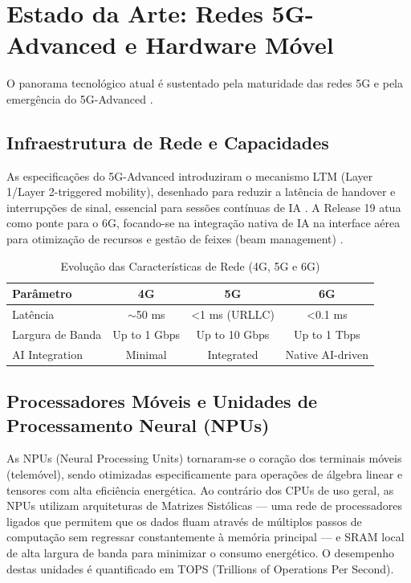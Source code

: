 \documentclass[runningheads]{llncs}
\begin{document}
\section{Estado da Arte: Redes 5G-Advanced e Hardware Móvel}
O panorama tecnológico atual é sustentado pela maturidade das redes 5G e pela emergência do 5G-Advanced \cite{ieee2022}.

\subsection{Infraestrutura de Rede e Capacidades}
As especificações do 5G-Advanced introduziram o mecanismo LTM (Layer 1/Layer 2-triggered mobility), desenhado para reduzir a latência de handover e interrupções de sinal, essencial para sessões contínuas de IA \cite{ieee2022}. A Release 19 atua como ponte para o 6G, focando-se na integração nativa de IA na interface aérea para otimização de recursos e gestão de feixes (beam management) \cite{3gpp_r19, eand2025}.

\begin{table}[h]
    \centering
    \caption{Evolução das Características de Rede (4G, 5G e 6G) \cite{researchgate2025}}
    \label{tab1}
    \begin{tabular}{lccc}
        \toprule
        \textbf{Parâmetro} & \textbf{4G} & \textbf{5G} & \textbf{6G} \\ 
        \midrule
        Latência & $\sim$50 ms & <1 ms (URLLC) & <0.1 ms \\
        Largura de Banda & Up to 1 Gbps & Up to 10 Gbps & Up to 1 Tbps \\
        AI Integration & Minimal & Integrated & Native AI-driven \\ 
        \bottomrule
    \end{tabular}
\end{table}

\subsection{Processadores Móveis e Unidades de Processamento Neural (NPUs)}
As NPUs (Neural Processing Units) tornaram-se o coração dos terminais móveis (telemóvel), sendo otimizadas especificamente para operações de álgebra linear e tensores com alta eficiência energética. Ao contrário dos CPUs de uso geral, as NPUs utilizam arquiteturas de Matrizes Sistólicas --- uma rede de processadores ligados que permitem que os dados fluam através de múltiplos passos de computação sem regressar constantemente à memória principal --- e SRAM local de alta largura de banda para minimizar o consumo energético. O desempenho destas unidades é quantificado em TOPS (Trillions of Operations Per Second).
\end{document}
